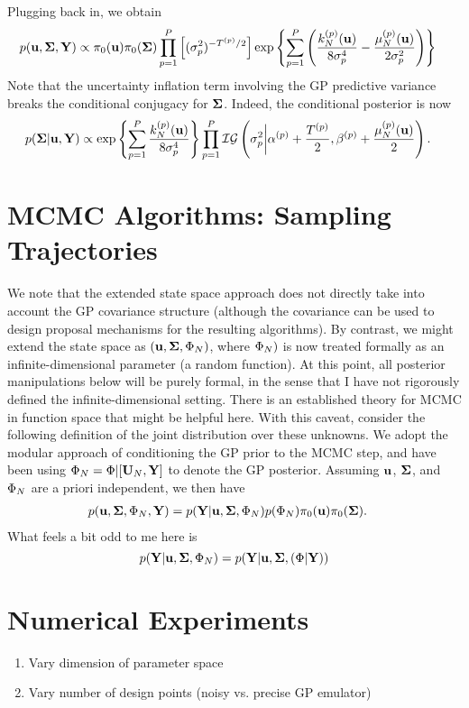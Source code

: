 \documentclass[12pt]{article}
\begin{document}
Plugging back in, we obtain 
\begin{align*}
p(\bpar, \CovObs, \stateMat) 
&\propto \priorDens(\bpar) \priorDens(\CovObs) \prod_{\objIdx=1}^{\Nobj} \left[(\sdObs^2_{\objIdx})^{-\indexObj{\Ntime}/2}\right]
\exp\left\{\sum_{\objIdx=1}^{\Nobj} \left(\frac{\GPKerPredOut{\Ndesign}{\objIdx}(\bpar)}{8\sdObs^4_{\objIdx}} -
 \frac{\GPMeanPredOut{\Ndesign}{\objIdx}(\bpar)}{2\sdObs^2_{\objIdx}}\right) \right\}
\end{align*}
Note that the uncertainty inflation term involving the GP predictive variance breaks the conditional conjugacy for $\CovObs$. Indeed, the conditional posterior is now 
\begin{align*}
p(\CovObs|\bpar, \stateMat) 
&\propto \exp\left\{\sum_{\objIdx=1}^{\Nobj} \frac{\GPKerPredOut{\Ndesign}{\objIdx}(\bpar)}{8\sdObs^4_{\objIdx}} \right\}
 \prod_{\objIdx=1}^{\Nobj} \mathcal{IG}\left(\sdObs^2_{\objIdx} \bigg| \indexObj{\IGShape}+\frac{\indexObj{\Ntime}}{2}, \indexObj{\IGScale} + \frac{\GPMeanPredOut{\Ndesign}{\objIdx}(\bpar)}{2} \right).
\end{align*}


\section{MCMC Algorithms: Sampling Trajectories}
We note that the extended state space approach does not directly take into account the GP covariance structure (although the covariance can be used to design proposal
mechanisms for the resulting algorithms). By contrast, we might extend the state space as $(\bpar, \CovObs, \indexDesign[\Ndesign]{\SSR})$, where $\indexDesign[\Ndesign]{\SSR})$
is now treated formally as an infinite-dimensional parameter (a random function). At this point, all posterior manipulations below will be purely formal, in the sense that I have not rigorously 
defined the infinite-dimensional setting. There is an established theory for MCMC in function space that might be helpful here. With this caveat, consider the following definition of the joint 
distribution over these unknowns. We adopt the modular approach of conditioning the GP prior to the MCMC step, and have been using 
$\indexDesign[\Ndesign]{\SSR} = \SSR | [\designMat[\Ndesign], \stateMat]$ to denote the GP posterior. Assuming $\bpar$, $\CovObs$, and $\indexDesign[\Ndesign]{\SSR} $ are a priori independent, 
we then have 
\begin{align*}
&p(\bpar, \CovObs, \indexDesign[\Ndesign]{\SSR}, \stateMat) = 
p(\stateMat | \bpar, \CovObs, \indexDesign[\Ndesign]{\SSR})p(\indexDesign[\Ndesign]{\SSR}) \priorDens(\bpar) \priorDens(\CovObs).
\end{align*}
What feels a bit odd to me here is 
\[
p(\stateMat | \bpar, \CovObs, \indexDesign[\Ndesign]{\SSR}) = p(\stateMat | \bpar, \CovObs, (\SSR|\stateMat))
\]


\section{Numerical Experiments}
\begin{enumerate}
\item Vary dimension of parameter space
\item Vary number of design points (noisy vs. precise GP emulator)
\end{enumerate}
\end{document}
